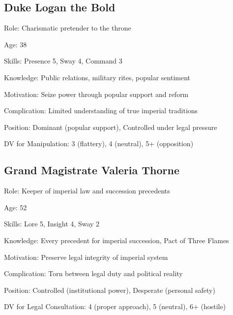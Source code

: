 \documentclass[11pt]{article}
\newenvironment{npc}[1]{\begin{description}[leftmargin=*,style=standard]\item[\textbf{#1}]}{\end{description}}
\begin{document}
\subsection{Duke Logan the Bold}
\begin{npc}{Duke Logan the Bold}
\item[Role:] Charismatic pretender to the throne
\item[Age:] 38
\item[Skills:] Presence 5, Sway 4, Command 3
\item[Knowledge:] Public relations, military rites, popular sentiment
\item[Motivation:] Seize power through popular support and reform
\item[Complication:] Limited understanding of true imperial traditions
\item[Position:] Dominant (popular support), Controlled under legal pressure
\item[DV for Manipulation:] 3 (flattery), 4 (neutral), 5+ (opposition)
\end{npc}

\subsection{Grand Magistrate Valeria Thorne}
\begin{npc}{Grand Magistrate Valeria Thorne}
\item[Role:] Keeper of imperial law and succession precedents
\item[Age:] 52
\item[Skills:] Lore 5, Insight 4, Sway 2
\item[Knowledge:] Every precedent for imperial succession, Pact of Three Flames
\item[Motivation:] Preserve legal integrity of imperial system
\item[Complication:] Torn between legal duty and political reality
\item[Position:] Controlled (institutional power), Desperate (personal safety)
\item[DV for Legal Consultation:] 4 (proper approach), 5 (neutral), 6+ (hostile)
\end{npc}
\end{document}
